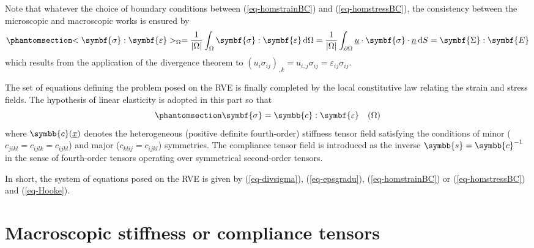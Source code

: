 \documentclass[
  a4paper,
  numbers=noendperiod,
  DIV=12]{scrreprt}
\newcommand{\uu}[1]{{\symbf{{#1}}}}
\newcommand{\uuuu}[1]{{\symbb{{#1}}}}
\newcommand{\uv}[1]{{\underline{{#1}}}}
\newcommand{\x}{{\uv{{x}}}}
\newcommand{\n}{{\uv{{n}}}}
\newcommand{\eps}{{\uu{{\varepsilon}}}}
\newcommand{\E}{{\uu{{E}}}}
\newcommand{\sig}{{\uu{{\sigma}}}}
\newcommand{\Sig}{{\uu{{\Sigma}}}}
\newcommand{\ud}{{\,\mathrm{d}}}
\begin{document}
\begin{tcolorbox}[enhanced jigsaw, arc=.35mm, bottomrule=.15mm, bottomtitle=1mm, breakable, colback=white, colbacktitle=quarto-callout-note-color!10!white, colframe=quarto-callout-note-color-frame, coltitle=black, left=2mm, leftrule=.75mm, opacityback=0, opacitybacktitle=0.6, rightrule=.15mm, title=\textcolor{quarto-callout-note-color}{\faInfo}\hspace{0.5em}{Hill lemma}, titlerule=0mm, toprule=.15mm, toptitle=1mm]

Note that whatever the choice of boundary conditions between
(\ref{eq-homstrainBC}) and (\ref{eq-homstressBC}), the consistency
between the microscopic and macroscopic works is ensured by
\begin{equation}\protect\phantomsection\label{eq-Hilllemma}{
<\sig:\eps>_{\Omega}
=\frac{1}{\lvert \Omega \rvert}\int_\Omega \sig:\eps\ud \Omega
=\frac{1}{\lvert \Omega \rvert}\int_{\partial\Omega} \uv{u}\cdot\sig\cdot\n \ud S
=\Sig:\E
}\end{equation} which results from the application of the divergence
theorem to
\((u_i\sigma_{ij})_{,k}=u_{i,j}\sigma_{ij}=\varepsilon_{ij}\sigma_{ij}\).

\end{tcolorbox}

The set of equations defining the problem posed on the RVE is finally
completed by the local constitutive law relating the strain and stress
fields. The hypothesis of linear elasticity is adopted in this part so
that \begin{equation}\protect\phantomsection\label{eq-Hooke}{
\sig=\uuuu{c}:\eps \quad(\Omega)
}\end{equation} where \(\uuuu{c}(\x)\) denotes the heterogeneous
(positive definite fourth-order) stiffness tensor field satisfying the
conditions of minor (\(c_{jikl}=c_{ijlk}=c_{ijkl}\)) and major
(\(c_{klij}=c_{ijkl}\)) symmetries. The compliance tensor field is
introduced as the inverse \(\uuuu{s}=\uuuu{c}^{-1}\) in the sense of
fourth-order tensors operating over symmetrical second-order tensors.

In short, the system of equations posed on the RVE is given by
(\ref{eq-divsigma}), (\ref{eq-epsgradu}), (\ref{eq-homstrainBC}) or
(\ref{eq-homstressBC}) and (\ref{eq-Hooke}).

\section{Macroscopic stiffness or compliance
tensors}\label{sec-basics_elas_mac_stiff}
\end{document}
